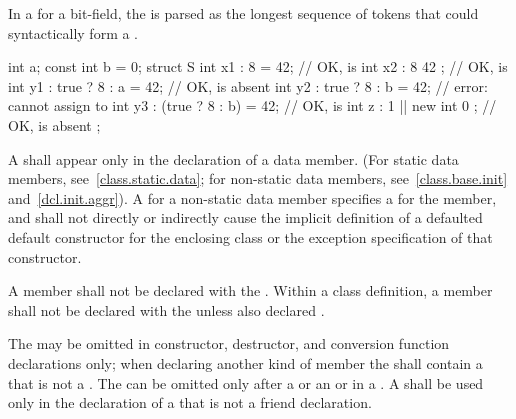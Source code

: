 \pnum
In a  for a bit-field,
the  is parsed as
the longest sequence of tokens
that could syntactically form a .
\begin{example}
\begin{codeblock}
int a;
const int b = 0;
struct S {
  int x1 : 8 = 42;              // OK,  is 
  int x2 : 8 { 42 };            // OK,  is 
  int y1 : true ? 8 : a = 42;   // OK,  is absent
  int y2 : true ? 8 : b = 42;   // error: cannot assign to 
  int y3 : (true ? 8 : b) = 42; // OK,  is 
  int z : 1 || new int { 0 };   // OK,  is absent
};
\end{codeblock}
\end{example}

\pnum
A  shall appear only in the
declaration of a data member. (For static data members,
see~\ref{class.static.data}; for non-static data members,
see~\ref{class.base.init} and~\ref{dcl.init.aggr}).
A  for a non-static data member
%
specifies a  for the member, and
shall not directly or indirectly cause the implicit definition of a
defaulted default constructor for the enclosing class or the
exception specification of that constructor.

\pnum
A member shall not be declared with the 
. Within a class definition, a member shall not be declared with the   unless also declared .

\pnum
The  may be omitted in constructor, destructor,
and conversion function declarations only;
when declaring another kind of member the 
shall contain a  that is not a .
The
 can be omitted only after a
 or an  or in a
. A
 shall be used only in the declaration of a
that is not a friend declaration.

